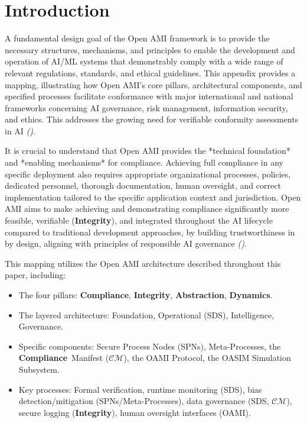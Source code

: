 \documentclass[12pt,a4paper]{report}
\renewcommand{\citep}[1]{\textit{\scriptsize{(\cite{#1})}}}
\newcommand{\Compliance}{\textbf{Compliance}}
\newcommand{\Integrity}{\textbf{Integrity}}
\newcommand{\Abstraction}{\textbf{Abstraction}}
\newcommand{\Dynamics}{\textbf{Dynamics}}
\begin{document}
	\section{Introduction}
	\label{app:compmap_intro}
	
	A fundamental design goal of the Open AMI framework is to provide the necessary structures, mechanisms, and principles to enable the development and operation of AI/ML systems that demonstrably comply with a wide range of relevant regulations, standards, and ethical guidelines. This appendix provides a mapping, illustrating how Open AMI's core pillars, architectural components, and specified processes facilitate conformance with major international and national frameworks concerning AI governance, risk management, information security, and ethics. This addresses the growing need for verifiable conformity assessments in AI \citep{Navigating_AI_Conformity_2025}.
	
	It is crucial to understand that Open AMI provides the *technical foundation* and *enabling mechanisms* for compliance. Achieving full compliance in any specific deployment also requires appropriate organizational processes, policies, dedicated personnel, thorough documentation, human oversight, and correct implementation tailored to the specific application context and jurisdiction. Open AMI aims to make achieving and demonstrating compliance significantly more feasible, verifiable (\Integrity), and integrated throughout the AI lifecycle compared to traditional development approaches, by building trustworthiness in by design, aligning with principles of responsible AI governance \citep{Responsible_AI_Governance_Review_2024}.
	
	This mapping utilizes the Open AMI architecture described throughout this paper, including:
	\begin{itemize}
		\item The four pillars: \Compliance, \Integrity, \Abstraction, \Dynamics.
		\item The layered architecture: Foundation, Operational (SDS), Intelligence, Governance.
		\item Specific components: Secure Process Nodes (SPNs), Meta-Processes, the \Compliance\ Manifest ($\mathcal{CM}$), the OAMI Protocol, the OASIM Simulation Subsystem.
		\item Key processes: Formal verification, runtime monitoring (SDS), bias detection/mitigation (SPNs/Meta-Processes), data governance (SDS, $\mathcal{CM}$), secure logging (\Integrity), human oversight interfaces (OAMI).
	\end{itemize}
	
\end{document}
